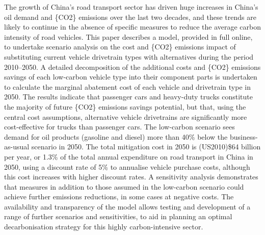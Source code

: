 The growth of China’s road transport sector has driven huge increases in China’s oil demand and \{CO2\} emissions over the last two decades, and these trends are likely to continue in the absence of specific measures to reduce the average carbon intensity of road vehicles. This paper describes a model, provided in full online, to undertake scenario analysis on the cost and \{CO2\} emissions impact of substituting current vehicle drivetrain types with alternatives during the period 2010–2050. A detailed decomposition of the additional costs and \{CO2\} emissions savings of each low-carbon vehicle type into their component parts is undertaken to calculate the marginal abatement cost of each vehicle and drivetrain type in 2050. The results indicate that passenger cars and heavy-duty trucks constitute the majority of future \{CO2\} emissions savings potential, but that, using the central cost assumptions, alternative vehicle drivetrains are significantly more cost-effective for trucks than passenger cars. The low-carbon scenario sees demand for oil products (gasoline and diesel) more than 40\% below the business-as-usual scenario in 2050. The total mitigation cost in 2050 is (US2010)\$64 billion per year, or 1.3\% of the total annual expenditure on road transport in China in 2050, using a discount rate of 5\% to annualise vehicle purchase costs, although this cost increases with higher discount rates. A sensitivity analysis demonstrates that measures in addition to those assumed in the low-carbon scenario could achieve further emissions reductions, in some cases at negative costs. The availability and transparency of the model allows testing and development of a range of further scenarios and sensitivities, to aid in planning an optimal decarbonisation strategy for this highly carbon-intensive sector.